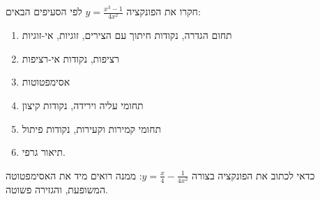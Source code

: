 
\begin{question}
חקרו את הפונקציה $y=\frac{x^3-1}{4x^2}$ לפי הסעיפים הבאים:
\begin{enumerate}
  \item תחום הגדרה, נקודות חיתוך עם הצירים, זוגיות, אי-זוגיות
  \item רציפות, נקודות אי-רציפות
  \item אסימפטוטות
  \item תחומי עליה וירידה, נקודות קיצון
  \item תחומי קמירות וקעירות, נקודות פיתול
  \item תיאור גרפי.
\end{enumerate}
\end{question}

\begin{hint}
כדאי לכתוב את הפונקציה בצורה $y=\frac{x}{4}-\frac{1}{4x^2}$: ממנה רואים מיד את האסימפטוטה המשופעת, והגזירה פשוטה.
\end{hint}

